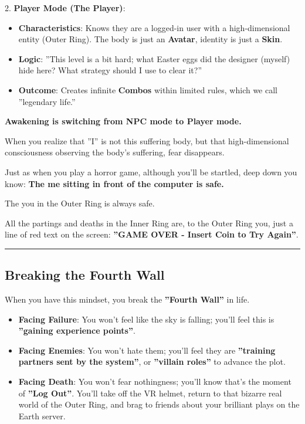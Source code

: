2.  \textbf{Player Mode (The Player)}:

    \begin{itemize}
    \item \textbf{Characteristics}: Knows they are a logged-in user with a high-dimensional entity (Outer Ring). The body is just an \textbf{Avatar}, identity is just a \textbf{Skin}.

    \item \textbf{Logic}: ''This level is a bit hard; what Easter eggs did the designer (myself) hide here? What strategy should I use to clear it?''

    \item \textbf{Outcome}: Creates infinite \textbf{Combos} within limited rules, which we call ''legendary life.''
    \end{itemize}

\textbf{Awakening is switching from NPC mode to Player mode.}

When you realize that ''I'' is not this suffering body, but that high-dimensional consciousness observing the body's suffering, fear disappears.

Just as when you play a horror game, although you'll be startled, deep down you know: \textbf{The me sitting in front of the computer is safe.}

The you in the Outer Ring is always safe.

All the partings and deaths in the Inner Ring are, to the Outer Ring you, just a line of red text on the screen: \textbf{''GAME OVER - Insert Coin to Try Again''}.

\hrule

\subsection{Breaking the Fourth Wall}

When you have this mindset, you break the \textbf{''Fourth Wall''} in life.

\begin{itemize}
\item \textbf{Facing Failure}: You won't feel like the sky is falling; you'll feel this is \textbf{''gaining experience points''}.

\item \textbf{Facing Enemies}: You won't hate them; you'll feel they are \textbf{''training partners sent by the system''}, or \textbf{''villain roles''} to advance the plot.

\item \textbf{Facing Death}: You won't fear nothingness; you'll know that's the moment of \textbf{''Log Out''}. You'll take off the VR helmet, return to that bizarre real world of the Outer Ring, and brag to friends about your brilliant plays on the Earth server.
\end{itemize}

